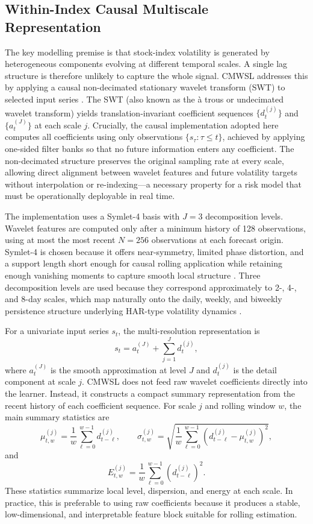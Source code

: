 \subsection{Within-Index Causal Multiscale Representation}

The key modelling premise is that stock-index volatility is generated by heterogeneous components evolving at different temporal scales. A single lag structure is therefore unlikely to capture the whole signal. CMWSL addresses this by applying a causal non-decimated stationary wavelet transform (SWT) to selected input series \cite{percival2000wavelet}. The SWT (also known as the \`{a} trous or undecimated wavelet transform) yields translation-invariant coefficient sequences $\{d_t^{(j)}\}$ and $\{a_t^{(J)}\}$ at each scale $j$. Crucially, the causal implementation adopted here computes all coefficients using only observations $\{s_\tau:\tau\leq t\}$, achieved by applying one-sided filter banks so that no future information enters any coefficient. The non-decimated structure preserves the original sampling rate at every scale, allowing direct alignment between wavelet features and future volatility targets without interpolation or re-indexing---a necessary property for a risk model that must be operationally deployable in real time.

The implementation uses a Symlet-4 basis with \(J=3\) decomposition levels. Wavelet features are computed only after a minimum history of 128 observations, using at most the most recent \(N=256\) observations at each forecast origin. Symlet-4 is chosen because it offers near-symmetry, limited phase distortion, and a support length short enough for causal rolling application while retaining enough vanishing moments to capture smooth local structure \cite{percival2000wavelet,souropanis2023wavelet}. Three decomposition levels are used because they correspond approximately to 2-, 4-, and 8-day scales, which map naturally onto the daily, weekly, and biweekly persistence structure underlying HAR-type volatility dynamics \cite{corsi2008har,andersen2003rvol}.

For a univariate input series \(s_t\), the multi-resolution representation is
\[
s_t=a_t^{(J)}+\sum_{j=1}^{J} d_t^{(j)},
\]
where \(a_t^{(J)}\) is the smooth approximation at level \(J\) and \(d_t^{(j)}\) is the detail component at scale \(j\). CMWSL does not feed raw wavelet coefficients directly into the learner. Instead, it constructs a compact summary representation from the recent history of each coefficient sequence. For scale \(j\) and rolling window \(w\), the main summary statistics are
\[
\mu_{t,w}^{(j)}=\frac{1}{w}\sum_{\ell=0}^{w-1} d_{t-\ell}^{(j)},
\qquad
\sigma_{t,w}^{(j)}=
\sqrt{\frac{1}{w}\sum_{\ell=0}^{w-1}\left(d_{t-\ell}^{(j)}-\mu_{t,w}^{(j)}\right)^2},
\]
and
\[
E_{t,w}^{(j)}=\frac{1}{w}\sum_{\ell=0}^{w-1}\left(d_{t-\ell}^{(j)}\right)^2.
\]
These statistics summarize local level, dispersion, and energy at each scale. In practice, this is preferable to using raw coefficients because it produces a stable, low-dimensional, and interpretable feature block suitable for rolling estimation.

